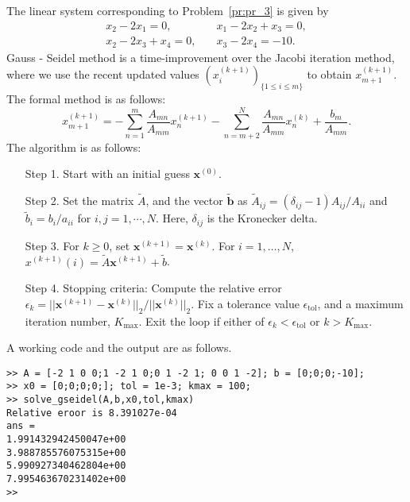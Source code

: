 \documentclass[11pt,a4paper,reqno]{article}
\begin{document}
The linear system corresponding to Problem~\ref{pr:pr_3} is given by 
\begin{align*}
x_2 - 2x_1 = 0,&\quad x_1 - 2x_2 + x_3 = 0,\\
x_2 - 2x_3 + x_4 = 0,&\quad x_3 - 2x_4 = -10.
\end{align*}
Gauss - Seidel method is a time-improvement over the Jacobi iteration method, where we use the recent updated values $(x^{(k+1)}_i)_{\{1 \leq i \leq m\}}$ to obtain $x^{(k+1)}_{m+1}$. The formal method is as follows:
\begin{equation}
x_{m+1}^{(k+1)} = -\sum_{n=1}^{m} \dfrac{A_{mn}}{A_{mm}}x_{n}^{(k+1)} -\sum_{n=m+2}^{N} \dfrac{A_{mn}}{A_{mm}}x_{n}^{(k)} +  \dfrac{b_{m}}{A_{mm}}.
\end{equation}
The algorithm is as follows:
\begin{tcolorbox}
	[colback=magenta!5!white,colframe=pink!100!black,fonttitle=\bfseries,title=Gauss-Seidel algorithm]
	\begin{itemize}
		\item[Step 1.] Start with an initial guess ${\pmb x}^{(0)}$.
		\item[Step 2.] Set the matrix $\widetilde{A}$, and the vector $\widetilde{\pmb b}$ as $\widetilde{A}_{ij} = (\delta_{ij} - 1)A_{ij}/A_{ii}$ and $\widetilde{b}_{i} = b_{i}/a_{ii}$ for $i,j=1,\cdots,N$. Here, $\delta_{ij}$ is the Kronecker delta.
		\item[Step 3.] For $k \ge 0$, set ${\pmb x}^{(k+1)} = {\pmb x}^{(k)}$. For $i = 1,\ldots,N$, 
		${x}^{(k+1)}(i) = \widetilde{A}{\pmb x}^{(k+1)} + \widetilde{b}$. 
		\item[Step 4.] Stopping criteria: Compute the relative error $\epsilon_k = ||{\pmb x}^{(k+1)} - {\pmb x}^{(k)}||_2/||{\pmb x}^{(k)}||_2$. Fix a tolerance value $\epsilon_{\mathrm{tol}}$, and a maximum iteration number, $K_{\mathrm{max}}$. Exit the loop if either of $\epsilon_k < \epsilon_{\mathrm{tol}}$ or $k > K_{\mathrm{max}}$. 
	\end{itemize}
\end{tcolorbox}
A working code and the output are as follows.

\begin{mdframed}[style=cframe,nobreak=true,align=center]
	\begin{verbatim}
>> A = [-2 1 0 0;1 -2 1 0;0 1 -2 1; 0 0 1 -2]; b = [0;0;0;-10];
>> x0 = [0;0;0;0;]; tol = 1e-3; kmax = 100;
>> solve_gseidel(A,b,x0,tol,kmax)
Relative eroor is 8.391027e-04
ans =
1.991432942450047e+00
3.988785576075315e+00
5.990927340462804e+00
7.995463670231402e+00
>>
\end{verbatim}
\end{mdframed}
\end{document}

